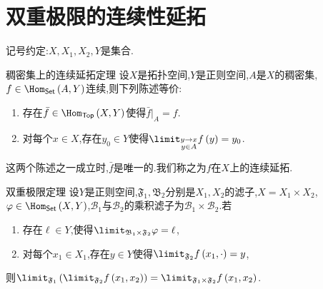 \section{双重极限的连续性延拓}

记号约定:$X,X_{1},X_{2},Y$是集合.

\begin{theorem}{稠密集上的连续延拓定理}{}
	设$X$是拓扑空间,$Y$是正则空间,$A$是$X$的稠密集,$f\in\Hom_{\mathsf{Set}}\left(A,Y\right)$连续,则下列陈述等价:
	\begin{enumerate}
		\item 存在$\bar{f}\in\Hom_{\mathsf{Top}}\left(X,Y\right)$使得$\bar{f}|_{A}=f$.
		\item 对每个$x\in X$,存在$y_{0}\in Y$使得$\limit_{\substack{y\to x\\ y\in A}}f\left(y\right)=y_{0}$.
	\end{enumerate}
	这两个陈述之一成立时,$\bar{f}$是唯一的.我们称之为$f$在$X$上的连续延拓.
\end{theorem}

\begin{corollary}{双重极限定理}{}
	设$Y$是正则空间,$\mathfrak{F}_{1},\mathfrak{B}_{2}$分别是$X_{1},X_{2}$的滤子,$X=X_{1}\times X_{2}$,$\varphi\in\Hom_{\mathsf{Set}}\left(X,Y\right)$,$\mathcal{B}_{1}$与$\mathcal{B}_{2}$的乘积滤子为$\mathcal{B}_{1}\times\mathcal{B}_{2}$.若
	\begin{enumerate}
		\item 存在$\ell\in Y$,使得$\limit_{\mathfrak{B}_{1}\times\mathfrak{F}_{2}}\varphi=\ell$,
		\item 对每个$x_{1}\in X_{1}$,存在$y\in Y$使得$\limit_{\mathfrak{F}_{2}}f\left(x_{1},\cdot\right)=y$,
	\end{enumerate}
	则$\limit_{\mathfrak{F}_{1}}\left(\limit_{\mathfrak{F}_{2}}f\left(x_{1},x_{2}\right)\right)=\limit_{\mathfrak{F}_{1}\times\mathfrak{F}_{2}}f\left(x_{1},x_{2}\right)$.
\end{corollary}
